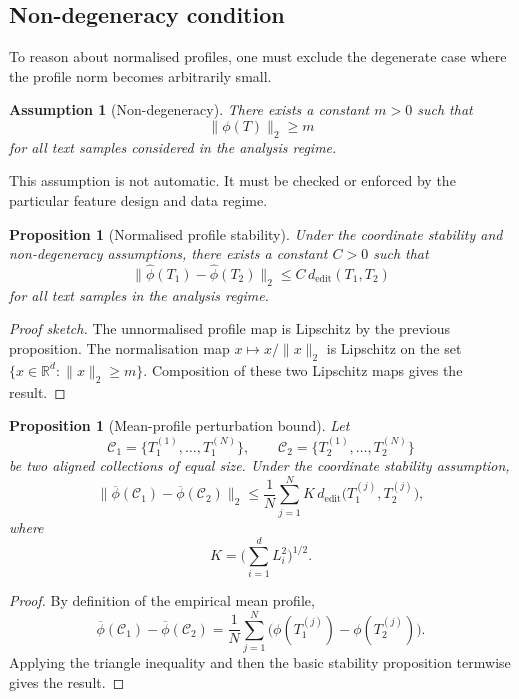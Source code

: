 \documentclass[11pt]{article}
\newtheorem{assumption}[definition]{Assumption}
\newtheorem{proposition}[definition]{Proposition}
\begin{document}
\subsection{Non-degeneracy condition}

To reason about normalised profiles, one must exclude the degenerate case where the profile norm becomes arbitrarily small.

\begin{assumption}[Non-degeneracy]
There exists a constant $m > 0$ such that
\[
\|\phi(T)\|_2 \geq m
\]
for all text samples considered in the analysis regime.
\end{assumption}

This assumption is not automatic. It must be checked or enforced by the particular feature design and data regime.

\begin{proposition}[Normalised profile stability]
Under the coordinate stability and non-degeneracy assumptions, there exists a constant $C > 0$ such that
\[
\|\widehat{\phi}(T_1) - \widehat{\phi}(T_2)\|_2 \leq C\, d_{\mathrm{edit}}(T_1, T_2)
\]
for all text samples in the analysis regime.
\end{proposition}

\begin{proof}[Proof sketch]
The unnormalised profile map is Lipschitz by the previous proposition. The normalisation map $x \mapsto x / \|x\|_2$ is Lipschitz on the set $\{x \in \mathbb{R}^d : \|x\|_2 \geq m\}$. Composition of these two Lipschitz maps gives the result.
\end{proof}

\begin{proposition}[Mean-profile perturbation bound]
Let
\[
\mathcal{C}_1 = \{T_1^{(1)}, \ldots, T_1^{(N)}\}, \qquad
\mathcal{C}_2 = \{T_2^{(1)}, \ldots, T_2^{(N)}\}
\]
be two aligned collections of equal size. Under the coordinate stability assumption,
\[
\|\overline{\phi}(\mathcal{C}_1) - \overline{\phi}(\mathcal{C}_2)\|_2
\leq
\frac{1}{N} \sum_{j=1}^{N} K\, d_{\mathrm{edit}}\big(T_1^{(j)}, T_2^{(j)}\big),
\]
where
\[
K = \Big(\sum_{i=1}^{d} L_i^2\Big)^{1/2}.
\]
\end{proposition}

\begin{proof}
By definition of the empirical mean profile,
\[
\overline{\phi}(\mathcal{C}_1) - \overline{\phi}(\mathcal{C}_2)
=
\frac{1}{N} \sum_{j=1}^{N} \big(\phi(T_1^{(j)}) - \phi(T_2^{(j)})\big).
\]
Applying the triangle inequality and then the basic stability proposition termwise gives the result.
\end{proof}
\end{document}
